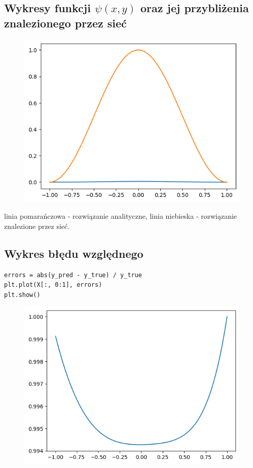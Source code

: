 \documentclass{article}
\begin{document}
	\subsection*{Wykresy funkcji $\psi (x, y)$ oraz jej przybliżenia znalezionego przez sieć}

	\begin{figure}[h]
		\centering
		\includegraphics[scale = 0.70]{wykres2.png}
	\end{figure}

	linia pomarańczowa - rozwiązanie analityczne, 
	linia niebieska - rozwiązanie znalezione przez sieć.

	\newpage

	\subsection*{Wykres błędu względnego}

	\begin{lstlisting}
errors = abs(y_pred - y_true) / y_true
plt.plot(X[:, 0:1], errors)
plt.show()
	\end{lstlisting}

	\begin{figure}[h]
		\centering
		\includegraphics[scale = 0.70]{wykres3.png}
	\end{figure}


	

	
	
	
\end{document}
